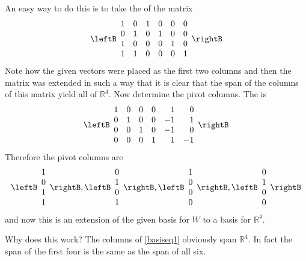 \begin{solution}
An easy way to do this is to take the \rref\; of the matrix 
\begin{equation}
\leftB
\begin{array}{cccccc}
1 & 0 & 1 & 0 & 0 & 0 \\ 
0 & 1 & 0 & 1 & 0 & 0 \\ 
1 & 0 & 0 & 0 & 1 & 0 \\ 
1 & 1 & 0 & 0 & 0 & 1
\end{array}
\rightB  \label{basiseq1}
\end{equation}
Note how the given vectors were placed as the first two columns and then the matrix
was extended in such a way that it is clear that the span of the columns of
this matrix yield all of $\mathbb{R}^{4}$. Now determine the pivot columns.
The \rref\; is 
\begin{equation}
\leftB
\begin{array}{rrrrrr}
1 & 0 & 0 & 0 & 1 & 0 \\ 
0 & 1 & 0 & 0 & -1 & 1 \\ 
0 & 0 & 1 & 0 & -1 & 0 \\ 
0 & 0 & 0 & 1 & 1 & -1
\end{array}
\rightB  \label{basiseq2}
\end{equation}
Therefore the pivot columns are 
\begin{equation*}
\leftB
\begin{array}{c}
1 \\ 
0 \\ 
1 \\ 
1
\end{array}
\rightB ,\leftB 
\begin{array}{c}
0 \\ 
1 \\ 
0 \\ 
1
\end{array}
\rightB ,\leftB 
\begin{array}{c}
1 \\ 
0 \\ 
0 \\ 
0
\end{array}
\rightB ,\leftB 
\begin{array}{c}
0 \\ 
1 \\ 
0 \\ 
0
\end{array}
\rightB
\end{equation*}
and now this is an extension of the given basis for $W$ to a basis for $
\mathbb{R}^{4}$.

Why does this work? The columns of \ref{basiseq1} obviously span $\mathbb{R
}^{4}$. In fact the span of the first four is the same as the span of all
six. 
\end{solution}

